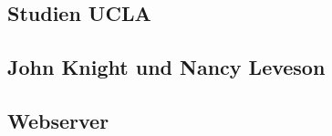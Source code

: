 
\subsection{Studien UCLA}\label{uclastudies}

\subsection{John Knight und Nancy Leveson}\label{matrixexperiement}



\subsection{Webserver}\label{webserver}